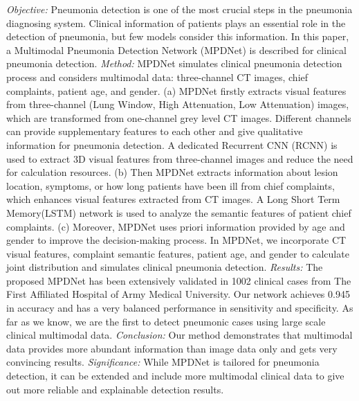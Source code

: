 \emph{Objective:} Pneumonia detection is one of the most crucial steps in the pneumonia diagnosing system. Clinical information of patients plays an essential role in the detection of pneumonia, but few models consider this information. In this paper, a Multimodal Pneumonia Detection Network (MPDNet) is described for clinical pneumonia detection.
\emph{Method:} MPDNet simulates clinical pneumonia detection process and considers multimodal data: three-channel CT images,  chief complaints, patient age, and gender. 
(a) MPDNet firstly extracts visual features from three-channel (Lung Window, High Attenuation, Low Attenuation) images, which are transformed from one-channel grey level CT images. Different channels can provide supplementary features to each other and give qualitative information for pneumonia detection. A dedicated Recurrent CNN (RCNN) is used to extract 3D visual features from three-channel images and reduce the need for calculation resources.
(b) Then MPDNet extracts information about lesion location, symptoms, or how long patients have been ill from chief complaints, which enhances visual features extracted from CT images. A Long Short Term Memory(LSTM) network is used to analyze the semantic features of patient chief complaints. 
(c) Moreover, MPDNet uses priori information provided by age and gender to improve the decision-making process.
In MPDNet, we incorporate CT visual features, complaint semantic features, patient age, and gender to calculate joint distribution and simulates clinical pneumonia detection.
\emph{Results:} The proposed MPDNet has been extensively validated in 1002 clinical cases from The First Affiliated Hospital of Army Medical University. Our network achieves 0.945 in accuracy and has a very balanced performance in sensitivity and specificity. As far as we know, we are the first to detect pneumonic cases using large scale clinical multimodal data.
\emph{Conclusion:} Our method demonstrates that multimodal data provides more abundant information than image data only and gets very convincing results.
\emph{Significance:} While MPDNet is tailored for pneumonia detection, it can be extended and include more multimodal clinical data to give out more reliable and explainable detection results.